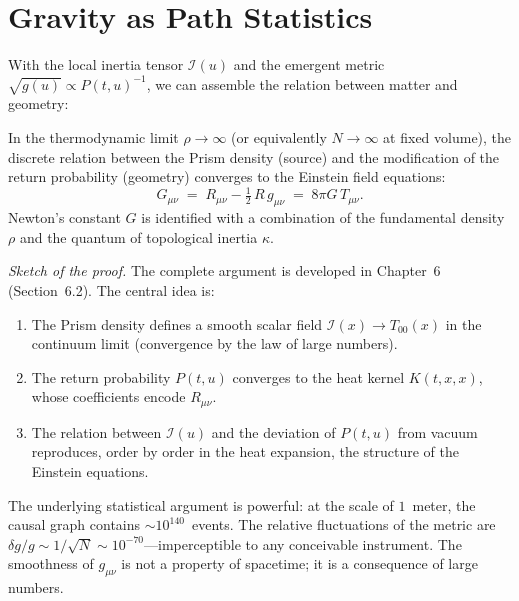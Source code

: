 \section{Gravity as Path Statistics}

With the local inertia tensor $\mathcal{I}(u)$ and the emergent
metric $\sqrt{g(u)} \propto P(t,u)^{-1}$, we can assemble the
relation between matter and geometry:

\begin{theorem}
\label{thm:einstein-statistical}
In the thermodynamic limit $\rho \to \infty$ (or equivalently
$N \to \infty$ at fixed volume), the discrete relation between the
Prism density (source) and the modification of the return probability
(geometry) converges to the Einstein field equations:
\begin{equation}
  \boxed{\;
  G_{\mu\nu}
  \;=\; R_{\mu\nu} - \tfrac{1}{2}\,R\,g_{\mu\nu}
  \;=\; 8\pi G\, T_{\mu\nu}.
  \;}
  \label{eq:einstein-limit}
\end{equation}
Newton's constant $G$ is identified with a combination of the
fundamental density~$\rho$ and the quantum of topological inertia
$\kappa$.
\end{theorem}

\noindent
\textit{Sketch of the proof.}
The complete argument is developed in Chapter~6
(Section~6.2). The central idea is:
\begin{enumerate}
  \item The Prism density defines a smooth scalar field
    $\mathcal{I}(x) \to T_{00}(x)$ in the continuum limit
    (convergence by the law of large numbers).
  \item The return probability $P(t, u)$ converges to the heat kernel
    $K(t, x, x)$, whose coefficients encode $R_{\mu\nu}$.
  \item The relation between $\mathcal{I}(u)$ and the deviation of
    $P(t,u)$ from vacuum reproduces, order by order in the heat
    expansion, the structure of the Einstein equations.
\end{enumerate}

\noindent
The underlying statistical argument is powerful: at the scale of
$1$~meter, the causal graph contains $\sim 10^{140}$~events. The
relative fluctuations of the metric are
$\delta g / g \sim 1/\sqrt{N} \sim 10^{-70}$---imperceptible to any
conceivable instrument. The smoothness of $g_{\mu\nu}$ is not a
property of spacetime; it is a consequence of large numbers.

